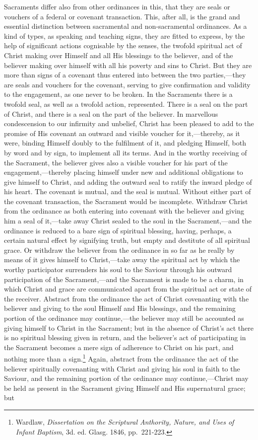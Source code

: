 \documentclass[]{book}
\begin{document}
Sacraments differ also from other ordinances in this, that they are seals or vouchers of a federal or covenant transaction. This, after all, is the grand and essential distinction between sacramental and non-sacramental ordinances. As a kind of types, as speaking and teaching signs, they are fitted to express, by the help of significant actions cognisable by the senses, the twofold spiritual act of Christ making over Himself and all His blessings to the believer, and of the believer making over himself with all his poverty and sins to Christ. But they are more than signs of a covenant thus entered into between the two parties,---they are seals and vouchers for the covenant, serving to give confirmation and validity to the engagement, as one never to be broken. In the Sacraments there is a twofold seal, as well as a twofold action, represented. There is a seal on the part of Christ, and there is a seal on the part of the believer. In marvellous condescension to our infirmity and unbelief, Christ has been pleased to add to the promise of His covenant an outward and visible voucher for it,---thereby, as it were, binding Himself doubly to the fulfilment of it, and pledging Himself, both by word and by sign, to implement all its terms. And in the worthy receiving of the Sacrament, the believer gives also a visible voucher for his part of the engagement,---thereby placing himself under new and additional obligations to give himself to Christ, and adding the outward seal to ratify the inward pledge of his heart. The covenant is mutual, and the seal is mutual. Without either part of the covenant transaction, the Sacrament would be incomplete. Withdraw Christ from the ordinance as both entering into covenant with the believer and giving him a seal of it,---take away Christ sealed to the soul in the Sacrament,---and the ordinance is reduced to a bare sign of spiritual blessing, having, perhaps, a certain natural effect by signifying truth, but empty and destitute of all spiritual grace. Or withdraw the believer from the ordinance in so far as he really by means of it gives himself to Christ,---take away the spiritual act by which the worthy participator surrenders his soul to the Saviour through his outward participation of the Sacrament,---and the Sacrament is made to be a charm, in which Christ and grace are communicated apart from the spiritual act or state of the receiver. Abstract from the ordinance the act of Christ covenanting with the believer and giving to the soul Himself and His blessings, and the remaining portion of the ordinance may continue,---the believer may still be accounted as giving himself to Christ in the Sacrament; but in the absence of Christ's act there is no spiritual blessing given in return, and the believer's act of participating in the Sacrament becomes a mere sign of adherence to Christ on his part, and nothing more than a sign.\footnote{Wardlaw, \emph{Dissertation on the Scriptural Anthority, Nature, and Uses of Infant Baptism}, 3d. ed. Glasg. 1846, pp.~221-223.} Again, abstract from the ordinance the act of the believer spiritually covenanting with Christ and giving his soul in faith to the Saviour, and the remaining portion of the ordinance may continue,---Christ may be held as present in the Sacrament giving Himself and His supernatural grace; but 
\end{document}
